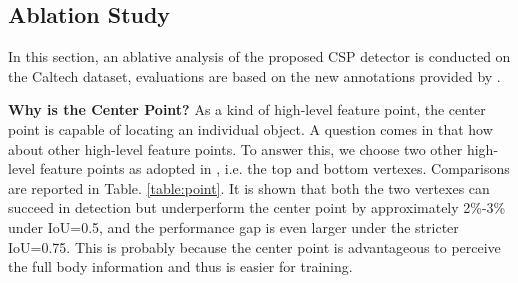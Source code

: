 \subsection{Ablation Study}\label{sec:abl}
In this section, an ablative analysis of the proposed CSP detector is conducted on the Caltech dataset, evaluations are based on the new annotations provided by \cite{zhang2016far}.

\textbf{Why is the Center Point?}
As a kind of high-level feature point, the center point is capable of locating an individual object. A question comes in that how about other high-level feature points. To answer this, we choose two other high-level feature points as adopted in \cite{Song_2018_ECCV}, i.e. the top and bottom vertexes. Comparisons are reported in Table. \ref{table:point}. It is shown that both the two vertexes can succeed in detection but underperform the center point by approximately 2\%-3\% under IoU=0.5, and the performance gap is even larger under the stricter IoU=0.75. This is probably because the center point is advantageous to perceive the full body information and thus is easier for training.

